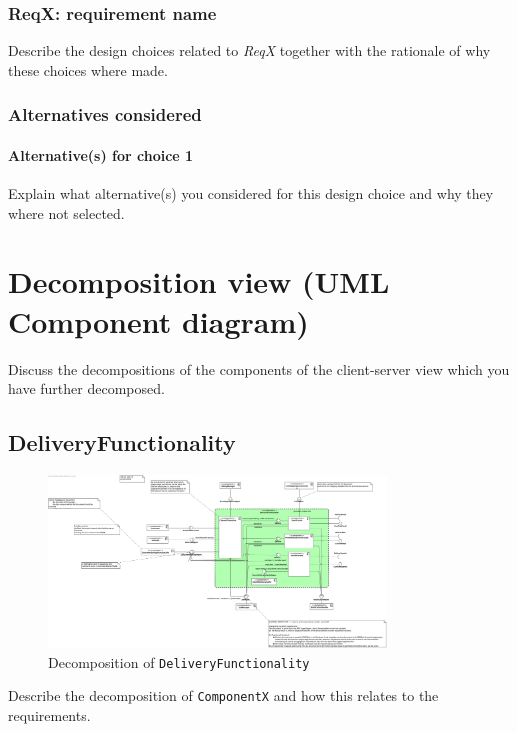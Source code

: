 \documentclass[a4paper,10pt]{article}
\begin{document}
\subsubsection{ReqX\@: requirement name}
Describe the design choices related to \emph{ReqX} together with the rationale
of why these choices where made.

\subsubsection*{Alternatives considered}
\paragraph{Alternative(s) for choice 1} Explain what alternative(s) you
considered for this design choice and why they where not selected.

\section{Decomposition view (UML Component diagram)}\label{sec:decomposition}
Discuss the decompositions of the components of the client-server view which
you have further decomposed.

\subsection{DeliveryFunctionality}
\begin{figure}[!htp]
	\centering
	\includegraphics[width=0.8\textwidth]{DeliveryFunctionality.png}
	\caption{Decomposition of \texttt{DeliveryFunctionality}}
	\label{fig:decomp-DeliveryFunctionality}
\end{figure}

Describe the decomposition of \texttt{ComponentX} and how this relates to the
requirements.
\end{document}
